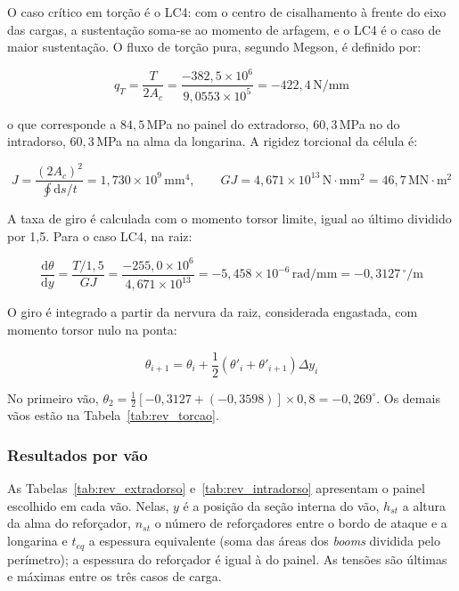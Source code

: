 O caso crítico em torção é o LC4: com o centro de cisalhamento à frente do eixo das cargas, a sustentação soma-se ao momento de arfagem, e o LC4 é o caso de maior sustentação. O fluxo de torção pura, segundo Megson, é definido por:
 
\begin{equation}
    q_T = \frac{T}{2A_c} = \frac{-382{,}5 \times 10^{6}}{9{,}0553 \times 10^{5}} = -422{,}4\,\text{N/mm}
    \label{eq:rev_qT}
\end{equation}
 
\noindent o que corresponde a $84{,}5$\,MPa no painel do extradorso, $60{,}3$\,MPa no do intradorso, $60{,}3$\,MPa na alma da longarina. A rigidez torcional da célula é:
 
\begin{equation}
    J = \frac{(2A_c)^2}{\oint \mathrm{d}s/t} = 1{,}730 \times 10^{9}\,\text{mm}^4, \qquad GJ = 4{,}671 \times 10^{13}\,\text{N}\cdot\text{mm}^2 = 46{,}7\,\text{MN}\cdot\text{m}^2
    \label{eq:rev_J}
\end{equation}
 
A taxa de giro é calculada com o momento torsor limite, igual ao último dividido por 1,5. Para o caso LC4, na raiz:
 
\begin{equation}
    \frac{\mathrm{d}\theta}{\mathrm{d}y} = \frac{T/1{,}5}{GJ} = \frac{-255{,}0 \times 10^{6}}{4{,}671 \times 10^{13}} = -5{,}458 \times 10^{-6}\,\text{rad/mm} = -0{,}3127\,^\circ\text{/m}
    \label{eq:rev_dtheta}
\end{equation}
 
O giro é integrado a partir da nervura da raiz, considerada engastada, com momento torsor nulo na ponta:
 
\begin{equation}
    \theta_{i+1} = \theta_i + \frac{1}{2}\left(\theta'_i + \theta'_{i+1}\right) \Delta y_i
    \label{eq:rev_theta}
\end{equation}
 
\noindent No primeiro vão, $\theta_2 = \tfrac{1}{2}\left[-0{,}3127 + (-0{,}3598)\right] \times 0{,}8 = -0{,}269^\circ$. Os demais vãos estão na Tabela~\ref{tab:rev_torcao}.
 
\subsubsection{Resultados por vão}
 
As Tabelas~\ref{tab:rev_extradorso} e~\ref{tab:rev_intradorso} apresentam o painel escolhido em cada vão. Nelas, $y$ é a posição da seção interna do vão, $h_{st}$ a altura da alma do reforçador, $n_{st}$ o número de reforçadores entre o bordo de ataque e a longarina e $t_{eq}$ a espessura equivalente (soma das áreas dos \textit{booms} dividida pelo perímetro); a espessura do reforçador é igual à do painel. As tensões são últimas e máximas entre os três casos de carga.
 
